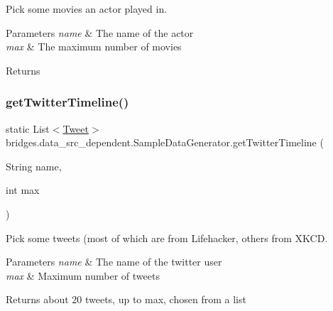 Pick some movies an actor played in. 
\begin{DoxyParams}{Parameters}
{\em name} & The name of the actor \\
\hline
{\em max} & The maximum number of movies \\
\hline
\end{DoxyParams}
\begin{DoxyReturn}{Returns}

\end{DoxyReturn}
\hypertarget{classbridges_1_1data__src__dependent_1_1_sample_data_generator_a9e52e53de820233e76553f5db1a01c80}{}\label{classbridges_1_1data__src__dependent_1_1_sample_data_generator_a9e52e53de820233e76553f5db1a01c80} 
\subsubsection{\texorpdfstring{get\+Twitter\+Timeline()}{getTwitterTimeline()}}
{\footnotesize\ttfamily static List$<$\hyperlink{classbridges_1_1data__src__dependent_1_1_tweet}{Tweet}$>$ bridges.\+data\+\_\+src\+\_\+dependent.\+Sample\+Data\+Generator.\+get\+Twitter\+Timeline (\begin{DoxyParamCaption}\item[{String}]{name,  }\item[{int}]{max }\end{DoxyParamCaption})\hspace{0.3cm}{\ttfamily [static]}}

Pick some tweets (most of which are from Lifehacker, others from X\+K\+CD. 
\begin{DoxyParams}{Parameters}
{\em name} & The name of the twitter user \\
\hline
{\em max} & Maximum number of tweets \\
\hline
\end{DoxyParams}
\begin{DoxyReturn}{Returns}
about 20 tweets, up to max, chosen from a list 
\end{DoxyReturn}
\hypertarget{classbridges_1_1data__src__dependent_1_1_sample_data_generator_ae37dc24f262b58481822cf228bd97054}{}\label{classbridges_1_1data__src__dependent_1_1_sample_data_generator_ae37dc24f262b58481822cf228bd97054} 
